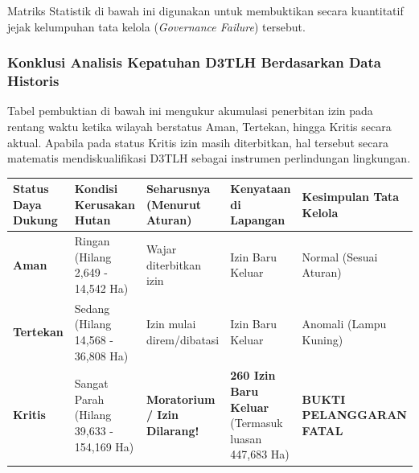\documentclass[
]{article}
\newcounter{none} %
\begin{document}
Matriks Statistik di bawah ini digunakan untuk membuktikan secara
kuantitatif jejak kelumpuhan tata kelola (\emph{Governance Failure})
tersebut.

\subsubsection{Konklusi Analisis Kepatuhan D3TLH Berdasarkan Data
Historis}\label{konklusi-analisis-kepatuhan-d3tlh-berdasarkan-data-historis}

Tabel pembuktian di bawah ini mengukur akumulasi penerbitan izin pada
rentang waktu ketika wilayah berstatus Aman, Tertekan, hingga Kritis
secara aktual. Apabila pada status Kritis izin masih diterbitkan, hal
tersebut secara matematis mendiskualifikasi D3TLH sebagai instrumen
perlindungan lingkungan.

{\def\LTcaptype{none} %
\begin{longtable}[]{@{}
  >{\raggedright\arraybackslash}p{}
  >{\raggedright\arraybackslash}p{}
  >{\raggedright\arraybackslash}p{}
  >{\raggedright\arraybackslash}p{}
  >{\raggedright\arraybackslash}p{}@{}}
\toprule\noalign{}
\begin{minipage}[b]{\linewidth}\raggedright
Status Daya Dukung
\end{minipage} & \begin{minipage}[b]{\linewidth}\raggedright
Kondisi Kerusakan Hutan
\end{minipage} & \begin{minipage}[b]{\linewidth}\raggedright
Seharusnya (Menurut Aturan)
\end{minipage} & \begin{minipage}[b]{\linewidth}\raggedright
Kenyataan di Lapangan
\end{minipage} & \begin{minipage}[b]{\linewidth}\raggedright
Kesimpulan Tata Kelola
\end{minipage} \\
\midrule\noalign{}
\endhead
\bottomrule\noalign{}
\endlastfoot
\textbf{Aman} & Ringan (Hilang 2,649 - 14,542 Ha) & Wajar diterbitkan
izin & 39 Izin Baru Keluar & Normal (Sesuai Aturan) \\
\textbf{Tertekan} & Sedang (Hilang 14,568 - 36,808 Ha) & Izin mulai
direm/dibatasi & 81 Izin Baru Keluar & Anomali (Lampu Kuning) \\
\textbf{Kritis} & Sangat Parah (Hilang 39,633 - 154,169 Ha) &
\textbf{Moratorium / Izin Dilarang!} & \textbf{260 Izin Baru Keluar}
(Termasuk luasan 447,683 Ha) & \textbf{BUKTI PELANGGARAN FATAL} \\
\end{longtable}
}
\end{document}
